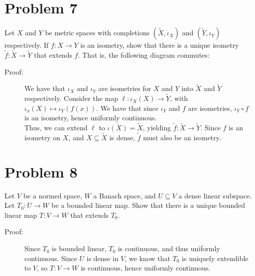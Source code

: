 \documentclass[10pt]{extarticle}
\begin{document}
  \section{Problem 7}%
  Let $X$ and $Y$ be metric spaces with completions $(\tilde{X},\iota_X)$ and $(\tilde{Y},\iota_Y)$ respectively. If $f: X\rightarrow Y$ is an isometry, show that there is a unique isometry $\tilde{f}: \tilde{X} \rightarrow \tilde{Y}$ that extends $f$. That is, the following diagram commutes:
  \begin{center}
  \end{center}
  \begin{description}
    \item[Proof:] We have that $\iota_X$ and $\iota_Y$ are isometries for $X$ and $Y$ into $\tilde{X}$ and $\tilde{Y}$ respectively. Consider the map $\ell: \iota_X(X)\rightarrow \tilde{Y}$, with $\iota_x(X)\mapsto \iota_Y(f(x))$. We have that since $\iota_Y$ and $f$ are isometries, $\iota_Y\circ f$ is an isometry, hence uniformly continuous.\\

      Thus, we can extend $\ell$ to $\overline{\iota(X)} = \tilde{X}$, yielding $\tilde{f}: \tilde{X}\rightarrow \tilde{Y}$. Since $f$ is an isometry on $X$, and $X\subseteq \tilde{X}$ is dense, $\tilde{f}$ must also be an isometry.
  \end{description}
  \section{Problem 8}%
  Let $V$ be a normed space, $W$ a Banach space, and $U\subseteq V$ a dense linear subspace. Let $T_0: U\rightarrow W$ be a bounded linear map. Show that there is a unique bounded linear map $T:V\rightarrow W$ that extends $T_0$.
  \begin{description}
    \item[Proof:] Since $T_0$ is bounded linear, $T_0$ is continuous, and thus uniformly continuous. Since $U$ is dense in $V$, we know that $T_0$ is uniquely extendible to $V$, so $T: V\rightarrow W$ is continuous, hence uniformly continuous.
  \end{description}
\end{document}
